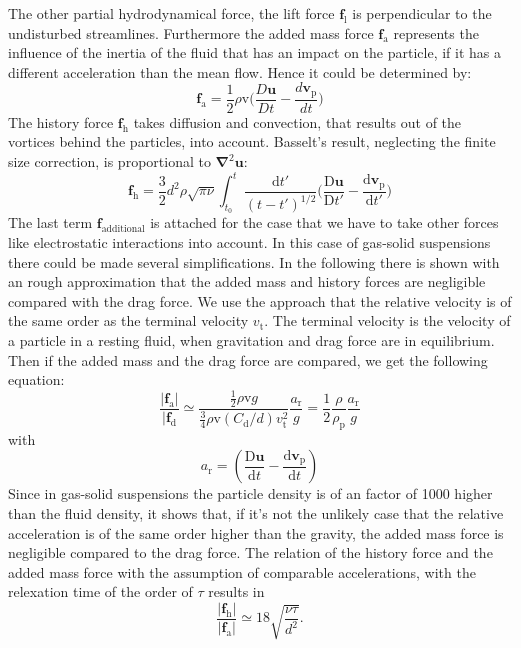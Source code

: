 \documentclass[11pt,a4paper,openany,oneside,parskip=half*]{article}
\renewcommand*\vec[1]{\boldsymbol{#1}}
\begin{document}
The other partial hydrodynamical force, the lift force $\vec{f}_\mathrm{l}$ is perpendicular to the undisturbed streamlines.
Furthermore the added mass force $\vec{f}_\mathrm{a}$ represents the influence of the inertia of the fluid that has an impact on the particle, if it has a different acceleration than the mean flow.
Hence it could be determined by:
\begin{equation}
\vec{f}_\mathrm{a} =  \frac{1}{2}\rho \mathrm{v} \biggl(\frac{D\vec{u}}{Dt}-\frac{d\vec{v}_\mathrm{p}}{dt}\biggl)
\end{equation}
The history force $\vec{f}_\mathrm{h}$ takes diffusion and convection, that results out of the vortices behind the particles, into account. Basselt's result, neglecting the finite size correction, is proportional to $\vec\nabla^\mathrm{2}\vec{u}$:
\begin{equation}
\vec{f}_\mathrm{h} = \frac{3}{2}d^\mathrm{2}\rho\sqrt{\pi\nu}\int_{t_\mathrm{0}}^{t} \frac{\mathrm{d}t'}{(t-t')^\mathrm{1/2}} \biggl(\frac{\mathrm{D}\vec{u}}{\mathrm{D}t'}- \frac{\mathrm{d}\vec{v}_\mathrm{p}}{\mathrm{d}t'}\biggl)  
\end{equation}
The last term $\vec{f}_\mathrm{additional}$ is attached for the case that we have to take other forces like electrostatic interactions into account.
In this case of gas-solid suspensions there could be made several simplifications.
In the following there is shown with an rough approximation that the added mass and history forces are negligible compared with the drag force.
We use the approach that the relative velocity is of the same order as the terminal velocity $v_\mathrm{t}$. The terminal velocity is the velocity of a particle in a resting fluid, when gravitation and drag force are in equilibrium. Then if the added mass and the drag force are compared, we get the following equation:
\begin{equation}
\frac{|\vec{f}_\mathrm{a}|}{|\vec{f}_\mathrm{d}} \simeq \frac{\frac{1}{2} \rho \mathrm{v} g}{\frac{3}{4} \rho \mathrm{v}(C_\mathrm{d}/d) v_\mathrm{t}^\mathrm{2}}\frac{a_\mathrm{r}}{g} = \frac{1}{2}\frac{\rho}{\rho_\mathrm{p}}\frac{a_\mathrm{r}}{g}
\end{equation}
with 
\begin{equation}
a_\mathrm{r}=(\frac{\mathrm{D}\vec{u}}{\mathrm{d}t}-\frac{\mathrm{d}\vec{v}_\mathrm{p}}{\mathrm{d}t})
\end{equation}
Since in gas-solid suspensions the particle density is of an factor of 1000 higher than the fluid density, it shows that, if it's not the unlikely case that the relative acceleration is of the same order higher than the gravity, the added mass force is negligible compared to the drag force.
The relation of the history force and the added mass force with the assumption of comparable accelerations, with the relexation time of the order of $\tau$ results in
\begin{equation}
\frac{|\vec{f}_\mathrm{h}|}{|\vec{f}_\mathrm{a}|}\simeq 18 \sqrt{\frac{\nu\tau}{d^\mathrm{2}}}.
\end{equation}
\end{document}
